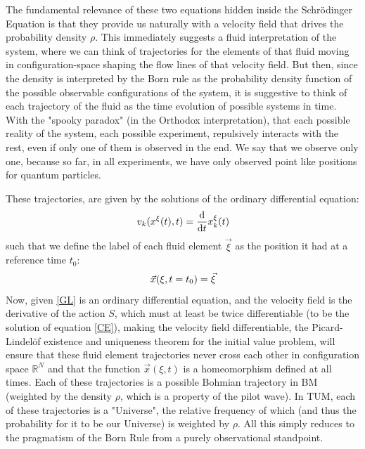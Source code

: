 \documentclass[11pt, a4paper]{article} %
\newcommand{\R}{\mathbb{R}} %
\begin{document}
The fundamental relevance of these two equations hidden inside the Schrödinger Equation is that they provide us naturally with a velocity field that drives the probability density $\rho$. This immediately suggests a fluid interpretation of the system, where we can think of trajectories for the elements of that fluid moving in configuration-space shaping the flow lines of that velocity field. But then, since the density is interpreted by the Born rule as the probability density function of the possible observable configurations of the system, it is suggestive to think of each trajectory of the fluid  as the time evolution of possible systems in time. With the "spooky paradox" (in the Orthodox interpretation), that each possible reality of the system, each possible experiment, repulsively interacts with the rest, even if only one of them is observed in the end. We say that we observe only one, because so far, in all experiments, we have only observed point like positions for quantum particles.

 These trajectories, are given by the solutions of the ordinary differential equation:\vspace{-0.1cm}
\begin{equation}\label{GL}
v_k(x^\xi(t),t)=\dv{}{t}x_k^\xi(t)\vspace{-0.1cm}
\end{equation}
such that we define the label of each fluid element $\vec{\xi}$ as the position it had at a reference time $t_0$:\vspace{-0.1cm}
\begin{equation}
\vec{x}(\xi,t=t_0)=\vec{\xi}\vspace{-0.1cm}
\end{equation}
Now, given \eqref{GL} is an ordinary differential equation, and the velocity field is the derivative of the action $S$, which must at least be twice differentiable (to be the solution of equation \eqref{CE}), making the velocity field differentiable, the Picard-Lindelöf existence and uniqueness theorem for the initial value problem, will ensure that these fluid element trajectories never cross each other in configuration space $\R^N$ and that the function $\vec{x}(\xi,t)$ is a homeomorphism defined at all times. Each of these trajectories is a possible Bohmian trajectory in BM (weighted by the density $\rho$, which is a property of the pilot wave). In TUM, each of these trajectories is a "Universe", the relative frequency of which (and thus the probability for it to be our Universe) is weighted by $\rho$. All this simply reduces to the pragmatism of the Born Rule from a purely observational standpoint.
\end{document}
